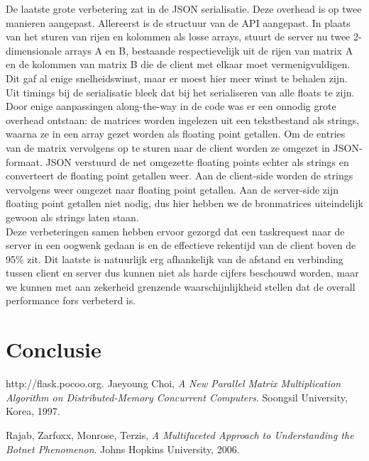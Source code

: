\documentclass[11pt]{article}
\begin{document}
De laatste grote verbetering zat in de JSON serialisatie. Deze overhead is op twee manieren
aangepast. Allereerst is de structuur van de API aangepast. In plaats van het sturen van rijen
en kolommen als losse arrays, stuurt de server nu twee 2-dimensionale arrays A en B,
bestaande respectievelijk uit de rijen van matrix A en de kolommen van matrix B die de client
met elkaar moet vermenigvuldigen. Dit gaf al enige snelheidswinst, maar er moest hier meer winst
te behalen zijn. Uit timings bij de serialisatie bleek dat bij het serialiseren van alle floats
te zijn. Door enige aanpassingen along-the-way in de code was er een onnodig grote overhead
ontstaan: de matrices worden ingelezen uit een tekstbestand als strings, waarna ze in een array
gezet worden als floating point getallen. Om de entries van de matrix vervolgens op te sturen
naar de client worden ze omgezet in JSON-formaat. JSON verstuurd de net omgezette floating points
echter als strings en converteert de floating point getallen weer. Aan de client-side worden de
strings vervolgens weer omgezet naar floating point getallen. Aan de server-side zijn floating
point getallen niet nodig, dus hier hebben we de bronmatrices uiteindelijk gewoon als strings
laten staan.\\
Deze verbeteringen samen hebben ervoor gezorgd dat een taskrequest naar de server in een oogwenk
gedaan is en de effectieve rekentijd van de client boven de 95\% zit. Dit laatste is natuurlijk
erg afhankelijk van de afstand en verbinding tussen client en server dus kunnen niet als harde
cijfers beschouwd worden, maar we kunnen met aan zekerheid grenzende waarschijnlijkheid stellen
dat de overall performance fors verbeterd is.

\section{Conclusie}

\begin{thebibliography}{9}

  http://flask.pocoo.org.
  Jaeyoung Choi,
  \emph{A New Parallel Matrix Multiplication Algorithm on Distributed-Memory Concurrent Computers}.
  Soongsil University, Korea,
  1997.
  
  Rajab, Zarfoxx, Monrose, Terzis,
  \emph{A Multifaceted Approach to Understanding the Botnet Phenomenon}.
  Johns Hopkins University,
  2006.
  

\end{thebibliography}
\end{document}
